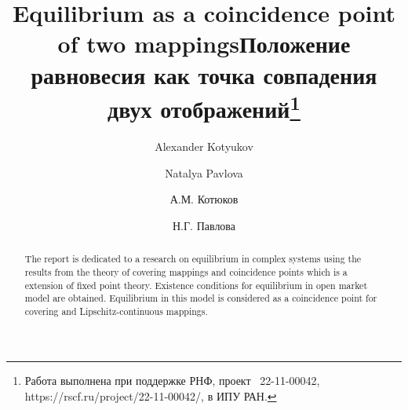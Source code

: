 \begin{englishtitle} %
\title{Equilibrium as a coincidence point of two mappings}
\author{Alexander Kotyukov  \and  Natalya Pavlova
}

\maketitle

\begin{abstract}
The report is dedicated to a research on equilibrium in complex systems using the results from the theory of covering mappings and coincidence points which is a extension of fixed point theory. Existence conditions for equilibrium in open market model are obtained. Equilibrium in this model is considered as a coincidence point for covering and Lipschitz-continuous mappings.

\end{abstract}
\end{englishtitle}


\ifflase
%
%


\documentclass[12pt]{llncs}  


\usepackage{iftex}

\ifPDFTeX
\usepackage[T2A]{fontenc}
\usepackage[utf8]{inputenc} %
\usepackage[english,russian]{babel}
\fi

\usepackage{todonotes} 

\usepackage[russian]{nla}


\fi

\title{Положение равновесия как точка совпадения \\ двух отображений\thanks{Работа выполнена при поддержке РНФ, проект \textnumero~22-11-00042, https://rscf.ru/project/22-11-00042/, в ИПУ РАН.}}
\author{А.М. Котюков    \and    Н.Г. Павлова
}

